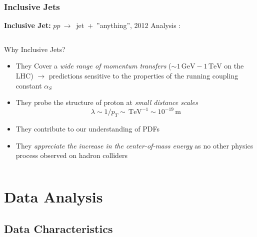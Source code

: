 \documentclass[compress]{beamer}
\newcommand{\GeV}{\,\text{GeV}}
\newcommand{\TeV}{\,\text{TeV}}
\newcommand{\pt}{p_{T}}
\begin{document}
\begin{frame}
\frametitle{Inclusive Jets} 
\textbf{Inclusive Jet:} $pp~\rightarrow$~jet~+~''anything'', 2012 Analysis
\scriptsize
{}:
\begin{columns}[onlytextwidth]
  \begin{column}{0.5\textwidth}
    \begin{figure}[b]
      \centering
      \texttt{[image: \{../PrezentationATLASmeeting/ATLASinclusive04]}.png}
    \end{figure}
  \end{column}
  \begin{column}{0.5\textwidth}
    \begin{block}{Why Inclusive Jets?}
      \begin{itemize}
        \item They Cover a \textit{\color{red}wide range of momentum transfers}
          ($\sim 1 \GeV - 1 \TeV$ on the LHC) $\rightarrow$ predictions sensitive to
          the properties of the running coupling constant $\alpha_S$
        \item They probe the structure of proton at \textit{\color{red}small
        distance scales}
        \begin{equation*}
          \lambda \sim 1/\pt \sim \TeV^{-1} \sim 10^{-19}\,\text{m}
        \end{equation*}
        \item They contribute to our understanding of PDFs
        \item They \textit{\color{red}appreciate the increase in the center-of-mass
        energy} as no other physics process observed on hadron colliders
      \end{itemize}
    \end{block}
  \end{column}
\end{columns}
\end{frame}


\section{Data Analysis}
\subsection{Data Characteristics}
\end{document}
